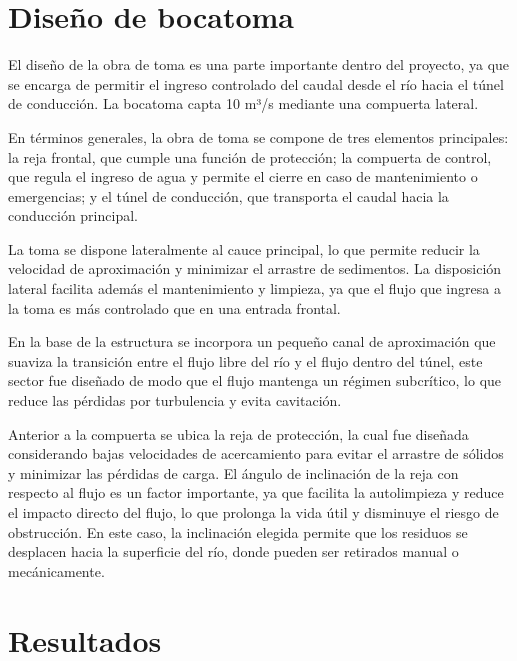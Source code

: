 \documentclass{article} %
\begin{document}
\section{Diseño de bocatoma}
El diseño de la obra de toma es una parte importante dentro del proyecto, ya que se  encarga de permitir el ingreso controlado del caudal desde el río hacia el túnel de conducción. La bocatoma capta 10 m³/s mediante una compuerta lateral.

En términos generales, la obra de toma se compone de tres elementos principales: la reja frontal, que cumple una función de protección; la compuerta de control, que regula el ingreso de agua y permite el cierre en caso de mantenimiento o emergencias; y el túnel de conducción, que transporta el caudal hacia la conducción principal.

La toma se dispone lateralmente al cauce principal, lo que permite reducir la velocidad de aproximación y minimizar el arrastre de sedimentos. La disposición lateral facilita además el mantenimiento y limpieza, ya que el flujo que ingresa a la toma es más controlado que en una entrada frontal.

En la base de la estructura se incorpora un pequeño canal de aproximación que suaviza la transición entre el flujo libre del río y el flujo dentro del túnel, este sector fue diseñado de modo que el flujo mantenga un régimen subcrítico, lo que reduce las pérdidas por turbulencia y evita cavitación.

Anterior a la compuerta se ubica la reja de protección, la cual fue diseñada considerando bajas velocidades de acercamiento para evitar el arrastre de sólidos y minimizar las pérdidas de carga. El ángulo de inclinación de la reja con respecto al flujo es un factor importante, ya que facilita la autolimpieza y reduce el impacto directo del flujo, lo que prolonga la vida útil y disminuye el riesgo de obstrucción. En este caso, la inclinación elegida permite que los residuos se desplacen hacia la superficie del río, donde pueden ser retirados manual o mecánicamente. 




\newpage
\section{Resultados}
\end{document}
